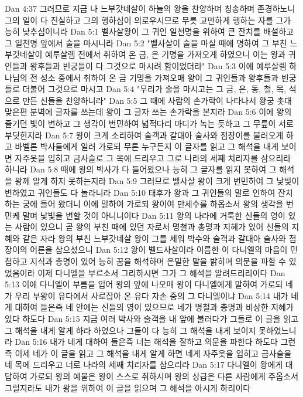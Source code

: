 Dan 4:37  그러므로 지금 나 느부갓네살이 하늘의 왕을 찬양하며 칭송하며 존경하노니 그의 일이 다 진실하고 그의 행하심이 의로우시므로 무릇 교만하게 행하는 자를 그가 능히 낮추심이니라
Dan 5:1  벨사살왕이 그 귀인 일천명을 위하여 큰 잔치를 배설하고 그 일천명 앞에서 술을 마시니라
Dan 5:2  "벨사살이 술을 마실 때에 명하여 그 부친 느부갓네살이 예루살렘 전에서 취하여 온 금, 은 기명을 가져오게 하였으니 이는 왕과 귀인들과 왕후들과 빈궁들이 다 그것으로 마시려 함이었더라"
Dan 5:3  이에 예루살렘 하나님의 전 성소 중에서 취하여 온 금 기명을 가져오매 왕이 그 귀인들과 왕후들과 빈궁들로 더불어 그것으로 마시고
Dan 5:4  "무리가 술을 마시고는 그 금, 은, 동, 철, 목, 석으로 만든 신들을 찬양하니라"
Dan 5:5  그 때에 사람의 손가락이 나타나서 왕궁 촛대 맞은편 분벽에 글자를 쓰는데 왕이 그 글자 쓰는 손가락을 본지라
Dan 5:6  이에 왕의 즐기던 빛이 변하고 그 생각이 번민하여 넓적다리 마디가 녹는 듯하고 그 무릎이 서로 부딪힌지라
Dan 5:7  왕이 크게 소리하여 술객과 갈대아 술사와 점장이를 불러오게 하고 바벨론 박사들에게 일러 가로되 무론 누구든지 이 글자를 읽고 그 해석을 내게 보이면 자주옷을 입히고 금사슬로 그 목에 드리우고 그로 나라의 세째 치리자를 삼으리라 하니라
Dan 5:8  때에 왕의 박사가 다 들어왔으나 능히 그 글자를 읽지 못하여 그 해석을 왕께 알게 하지 못하는지라
Dan 5:9  그러므로 벨사살 왕이 크게 번민하여 그 낯빛이 변하였고 귀인들도 다 놀라니라
Dan 5:10  태후가 왕과 그 귀인들의 말로 인하여 잔치하는 궁에 들어 왔더니 이에 말하여 가로되 왕이여 만세수를 하옵소서 왕의 생각을 번민케 말며 낯빛을 변할 것이 아니니이다
Dan 5:11  왕의 나라에 거룩한 신들의 영이 있는 사람이 있으니 곧 왕의 부친 때에 있던 자로서 명철과 총명과 지혜가 있어 신들의 지혜와 같은 자라 왕의 부친 느부갓네살 왕이 그를 세워 박수와 술객과 갈대아 술사와 점장이의 어른을 삼으셨으니
Dan 5:12  왕이 벨드사살이라 이름한 이 다니엘의 마음이 민첩하고 지식과 총명이 있어 능히 꿈을 해석하며 은밀한 말을 밝히며 의문을 파할 수 있었음이라 이제 다니엘을 부르소서 그리하시면 그가 그 해석을 알려드리리이다
Dan 5:13  이에 다니엘이 부름을 입어 왕의 앞에 나오매 왕이 다니엘에게 말하여 가로되 네가 우리 부왕이 유다에서 사로잡아 온 유다 자손 중의 그 다니엘이냐
Dan 5:14  내가 네게 대하여 들은즉 네 안에는 신들의 영이 있으므로 네가 명철과 총명과 비상한 지혜가 있다 하도다
Dan 5:15  지금 여러 박사와 술객을 내 앞에 불러다가 그들로 이 글을 읽고 그 해석을 내게 알게 하라 하였으나 그들이 다 능히 그 해석을 내게 보이지 못하였느니라
Dan 5:16  내가 네게 대하여 들은즉 너는 해석을 잘하고 의문을 파한다 하도다 그런즉 이제 네가 이 글을 읽고 그 해석을 내게 알게 하면 네게 자주옷을 입히고 금사슬을 네 목에 드리우고 너로 나라의 세째 치리자를 삼으리라
Dan 5:17  다니엘이 왕에게 대답하여 가로되 왕의 예물은 왕이 스스로 취하시며 왕의 상급은 다른 사람에게 주옵소서 그럴지라도 내가 왕을 위하여 이 글을 읽으며 그 해석을 아시게 하리이다
